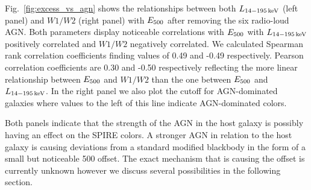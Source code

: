 Fig.~\ref{fig:excess_vs_agn} shows the relationships between both $L_{\rm 14-195\,keV}$ (left panel) and $W1/W2$ (right panel) with $E_{\rm 500}$ after removing the six radio-loud AGN. Both parameters display noticeable correlations with $E_{\rm 500}$ with $L_{\rm 14-195\,keV}$ positively correlated and $W1/W2$ negatively correlated. We calculated Spearman rank correlation coefficients finding values of 0.49 and -0.49 respectively. Pearson correlation coefficients are 0.30 and -0.50 respectively reflecting the more linear relationship between $E_{\rm 500}$ and $W1/W2$ than the one between $E_{\rm 500}$ and $L_{\rm 14-195\,keV}$. In the right panel we also plot the \citet{Stern:2012mz} cutoff for AGN-dominated galaxies where values to the left of this line indicate AGN-dominated colors. 

Both panels indicate that the strength of the AGN in the host galaxy is possibly having an effect on the SPIRE colors. A stronger AGN in relation to the host galaxy is causing deviations from a standard modified blackbody in the form of a small but noticeable 500 \um{} offset. The exact mechanism that is causing the offset is currently unknown however we discuss several possibilities in the following section.
  